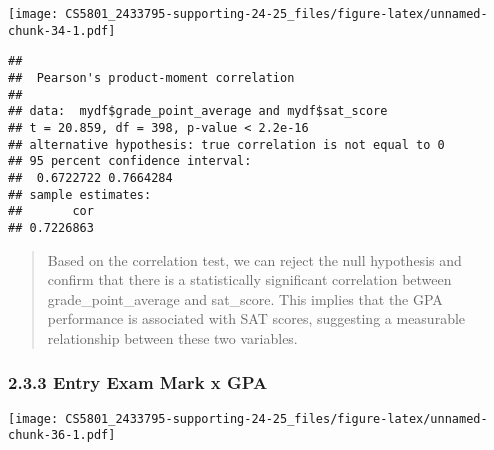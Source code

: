 \documentclass[
]{article}
\newenvironment{Shaded}{\begin{snugshade}}{\end{snugshade}}
\newcommand{\AttributeTok}[1]{\textcolor[rgb]{0.13,0.29,0.53}{#1}}
\newcommand{\CommentTok}[1]{\textcolor[rgb]{0.56,0.35,0.01}{\textit{#1}}}
\newcommand{\DecValTok}[1]{\textcolor[rgb]{0.00,0.00,0.81}{#1}}
\newcommand{\FunctionTok}[1]{\textcolor[rgb]{0.13,0.29,0.53}{\textbf{#1}}}
\newcommand{\NormalTok}[1]{#1}
\newcommand{\SpecialCharTok}[1]{\textcolor[rgb]{0.81,0.36,0.00}{\textbf{#1}}}
\newcommand{\StringTok}[1]{\textcolor[rgb]{0.31,0.60,0.02}{#1}}
\begin{document}
\texttt{[image: CS5801\_2433795-supporting-24-25\_files/figure-latex/unnamed-chunk-34-1.pdf]}

\begin{Shaded}
\end{Shaded}

\begin{verbatim}
## 
##  Pearson's product-moment correlation
## 
## data:  mydf$grade_point_average and mydf$sat_score
## t = 20.859, df = 398, p-value < 2.2e-16
## alternative hypothesis: true correlation is not equal to 0
## 95 percent confidence interval:
##  0.6722722 0.7664284
## sample estimates:
##       cor 
## 0.7226863
\end{verbatim}

\begin{quote}
Based on the correlation test, we can reject the null hypothesis and
confirm that there is a statistically significant correlation between
grade\_point\_average and sat\_score. This implies that the GPA
performance is associated with SAT scores, suggesting a measurable
relationship between these two variables.
\end{quote}

\subsubsection{2.3.3 Entry Exam Mark x GPA}\label{entry-exam-mark-x-gpa}

\begin{Shaded}
\end{Shaded}

\texttt{[image: CS5801\_2433795-supporting-24-25\_files/figure-latex/unnamed-chunk-36-1.pdf]}
\end{document}
